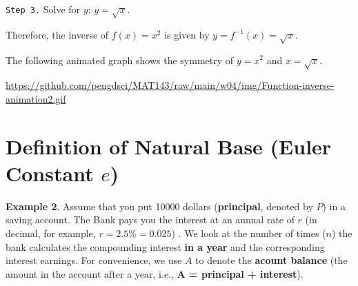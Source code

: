 \documentclass[
]{book}
\begin{document}
\texttt{Step\ 3.} Solve for \(y\): \(y = \sqrt{x}\).

Therefore, the inverse of \(f(x) = x^2\) is given by \(y = f^{-1}(x) = \sqrt{x}\).

The following animated graph shows the symmetry of \(y = x^2\) and \(x = \sqrt{x}\).

\hfill\break

\url{https://github.com/pengdsci/MAT143/raw/main/w04/img/Function-inverse-animation2.gif}

\hfill\break

\hypertarget{definition-of-natural-base-euler-constant-e}{%
\section{\texorpdfstring{Definition of Natural Base (Euler Constant \(e\))}{Definition of Natural Base (Euler Constant e)}}\label{definition-of-natural-base-euler-constant-e}}

\hfill\break

\textbf{Example 2}. Assume that you put 10000 dollars (\textbf{principal}, denoted by \(P\)) in a saving account. The Bank pays you the interest at an annual rate of \(r\) (in decimal, for example, \(r = 2.5\% = 0.025\)) . We look at the number of times (\(n\)) the bank calculates the compounding interest \textbf{in a year} and the corresponding interest earnings. For convenience, we use \(A\) to denote the \textbf{acount balance} (the amount in the account after a year, i.e., \textbf{A = principal + interest}).
\end{document}
